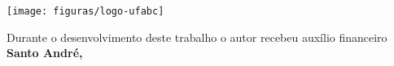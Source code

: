 \thispagestyle{empty}
\texttt{[image: figuras/logo-ufabc]} \hfill

\vspace*{2.8cm}
\begin{center}
  {\Large \autor}
\end{center}
\vspace{5cm}
\begin{center}
  {\huge \bfseries \titulo}
\end{center}
\vfill
\begin{center}
  { Durante o desenvolvimento deste trabalho o autor
recebeu auxílio financeiro \fomento \\} \vspace{0.8cm}
  {\bfseries Santo  André, \ano}
\end{center}
